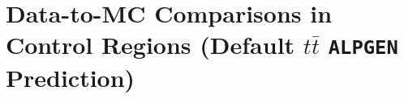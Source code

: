 \section{Data-to-MC Comparisons in Control Regions (Default $t\bar{t}$ \texttt{ALPGEN} Prediction)}
\label{app:DataMCControl}


\clearpage

\clearpage

